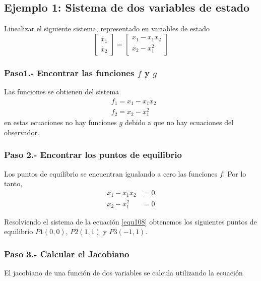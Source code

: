 \documentclass[12pt]{book}
\theoremstyle{definition}
\theoremstyle{remark}
\theoremstyle{plain}
\begin{document}
\subsection{Ejemplo 1: Sistema de dos variables de estado}
Linealizar el siguiente sistema, representado en variables de estado
\begin{equation}
\label{equ106}
\begin{bmatrix}
\dot{x_1}\\
\dot{x_2}
\end{bmatrix}
=
\begin{bmatrix}
x_1 - x_1 x_2\\
x_2 - x_1^2
\end{bmatrix}
\end{equation}

\subsubsection{Paso1.- Encontrar las funciones $f$ y $g$}
Las funciones se obtienen del sistema 
\begin{equation}
\label{equ107}
\begin{aligned}
& f_1 = x_1 - x_1 x_2\\
& f_2 = x_2 - x_1^2
\end{aligned}
\end{equation}
en estas ecuaciones no hay funciones $g$ debido a que no hay ecuaciones del observador.

\subsubsection{Paso 2.- Encontrar los puntos de equilibrio}
Los puntos de equilibrio se encuentran igualando a cero las funciones $f$. Por lo tanto, 
\begin{equation}
\label{equ108}
\begin{aligned}
 x_1 - x_1 x_2 &=0\\
x_2 - x_1^2 &=0
\end{aligned}
\end{equation}

Resolviendo el sistema de la ecuación \ref{equ108} obtenemos los siguientes puntos de equilibrio
$P1(0,0)$, $P2(1,1)$ y $P3(-1,1)$.

\subsubsection{Paso 3.- Calcular el Jacobiano}
El jacobiano de una función de dos variables se calcula utilizando la ecuación 
\end{document}
